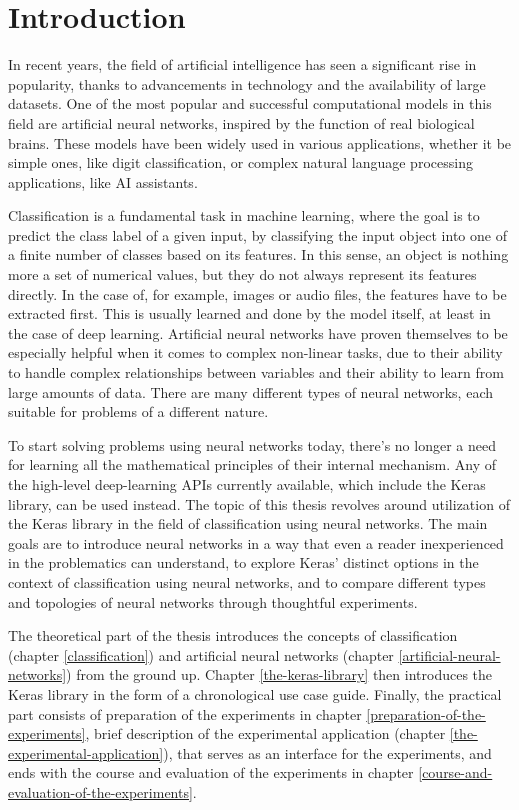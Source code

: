 
\chapter{Introduction}
\label{introduction}
In recent years, the field of artificial intelligence has seen a significant rise in popularity, thanks to advancements in technology and the availability of large datasets.
One of the most popular and successful computational models in this field are artificial
neural networks, inspired by the function of real biological brains. These models have been widely used
in various applications, whether it be simple ones, like digit classification, or complex natural language
processing applications, like AI assistants.

Classification is a fundamental task in machine learning,
where the goal is to predict the class label of a given input,
by classifying the input object into one of a finite number of classes based on its features.
In this sense, an object is nothing more a set of numerical values, but they do not always represent its features directly.
In the case of, for example,
images or audio files, the features have to be extracted first.
This is usually learned and done by the model itself, at least in the case of deep learning.
Artificial neural networks have proven themselves to be especially helpful when it comes to
complex non-linear tasks, due to their ability to handle complex relationships between variables
and their ability to learn from large amounts of data.
There are many different types of neural networks, each suitable for problems of a different nature.

To start solving problems using neural networks today, there's no longer
a need for learning all the mathematical principles of their internal mechanism.
Any of the high-level deep-learning APIs currently available, which include
the Keras library, can be used instead.
The topic of this thesis revolves around utilization of the Keras library
in the field of classification using neural networks.
The main goals are to introduce neural networks in a way that even a reader inexperienced in the problematics
can understand, to explore Keras' distinct options in the context of classification using neural networks,
and to compare different types and topologies of neural networks through thoughtful experiments.

The theoretical part of the thesis introduces the concepts of classification (chapter \ref{classification})
and artificial neural networks (chapter \ref{artificial-neural-networks}) from the ground up.
Chapter \ref{the-keras-library} then introduces the Keras library in the form of a chronological use case guide.
Finally, the practical part consists of preparation of the experiments in chapter \ref{preparation-of-the-experiments},
brief description of the experimental application (chapter \ref{the-experimental-application}), that serves
as an interface for the experiments, and ends with the course and evaluation of the experiments in chapter
\ref{course-and-evaluation-of-the-experiments}.




